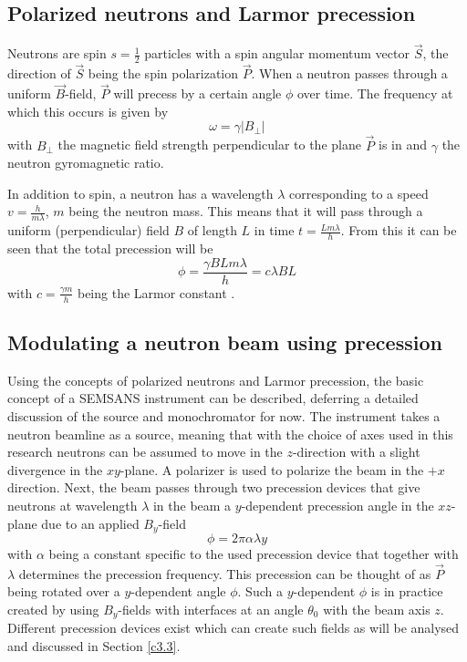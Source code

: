 \documentclass{article}
\begin{document}
\subsection{Polarized neutrons and Larmor precession}
\label{c2.1}
Neutrons are spin $s=\frac{1}{2}$ particles with a spin angular momentum vector $\vec{S}$, the direction of $\vec{S}$ being the spin polarization $\vec{P}$. When a neutron passes through a uniform $\vec{B}$-field, $\vec{P}$ will precess by a certain angle $\phi$ over time. The frequency at which this occurs is given by
$$\omega = \gamma |B_\perp|$$
with $B_\perp$ the magnetic field strength perpendicular to the plane $\vec{P}$ is in and $\gamma$ the neutron gyromagnetic ratio. 

In addition to spin, a neutron has a wavelength $\lambda$ corresponding to a speed $v = \frac{h}{m\lambda}$, $m$ being the neutron mass. This means that it will pass through a uniform (perpendicular) field $B$ of length $L$ in time $t = \frac{Lm\lambda}{h}$. From this it can be seen that the total precession will be 
\begin{equation}
	\phi = \frac{\gamma B L m\lambda}{h} = c\lambda B L \label{eq:larmor-prec}
\end{equation}
with $c = \frac{\gamma m}{h}$ being the Larmor constant \cite{bouwman2021b}.   
\subsection{Modulating a neutron beam using precession}
\label{c2.2}
Using the concepts of polarized neutrons and Larmor precession, the basic concept of a SEMSANS instrument can be described, deferring a detailed discussion of the source and monochromator for now. The instrument takes a neutron beamline as a source, meaning that with the choice of axes used in this research neutrons can be assumed to move in the $z$-direction with a slight divergence in the $xy$-plane. A polarizer is used to polarize the beam in the $+x$ direction. Next, the beam passes through two precession devices  that give neutrons at wavelength $\lambda$ in the beam a $y$-dependent precession angle in the $xz$-plane due to an applied $B_y$-field %
\begin{equation}
	\phi = 2\pi\alpha\lambda y \label{eq:precession-freq}
\end{equation}
with $\alpha$ being a constant specific to the used precession device that together with $\lambda$ determines the precession frequency. This precession can be thought of as $\vec{P}$ being rotated over a $y$-dependent angle $\phi$. Such a $y$-dependent $\phi$ is in practice created by using $B_y$-fields with interfaces at an angle $\theta_0$ with the beam axis $z$. Different precession devices exist which can create such fields as will be analysed and discussed in Section \ref{c3.3}.
\end{document}
